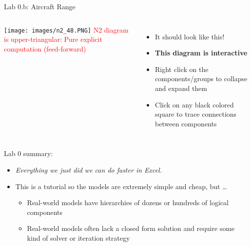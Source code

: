 \documentclass[aspectratio=169, usenames,dvipsnames, 14pt]{beamer}
\begin{document}
\begin{frame}{Lab 0.b: Aircraft Range}
    \begin{columns}
            \texttt{[image: images/n2\_48.PNG]}\newline   %
            \footnotesize \textcolor{red}{N2 diagram is upper-triangular:
            Pure explicit \newline computation (feed-forward)}

            \begin{itemize}
                \item It should look like this!
                \vspace{0.5cm}
                \item \textbf{This diagram is interactive}
                \vspace{0.5cm}
                \item Right click on the components/groups to collapse and expand them
                \vspace{0.5cm}
                \item Click on any black colored square to trace connections between components
            \end{itemize}
    \end{columns}
\end{frame}         %


\begin{frame}{Lab 0 summary:}
    \begin{itemize}
        \item \textit{Everything we just did we can do faster in Excel.}
        \vspace{0.5cm}
        \item This is a tutorial so the models are extremely simple and cheap, but … 
        \vspace{0.25cm}
            \begin{itemize}
                \vspace{0.25cm}
                \item Real-world models have hierarchies of dozens or hundreds of logical components
                \vspace{0.25cm}
                \item Real-world models often lack a closed form solution and require some kind of solver or iteration strategy
            \end{itemize}
    \end{itemize}
\end{frame}
\end{document}

